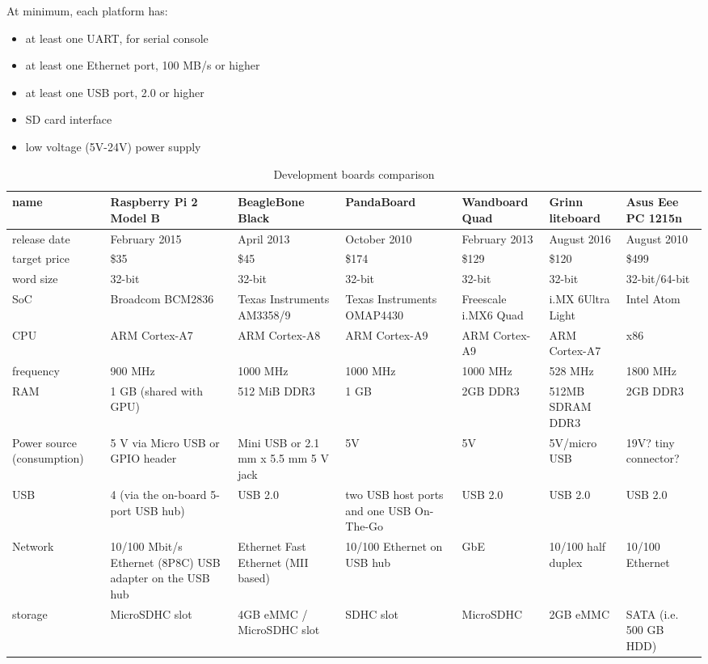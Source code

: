 \documentclass[printmode]{mgr}
\begin{document}
At minimum, each platform has:
\begin{itemize}
  \item at least one UART, for serial console
  \item at least one Ethernet port, 100 MB/s or higher
  \item at least one USB port, 2.0 or higher
  \item SD card interface
  \item low voltage (5V-24V) power supply
\end{itemize}

\renewcommand{\arraystretch}{2}
\begin{table}
  \begin{tabular}{| p{2cm} | p{2cm} | p{2cm} | p{2cm} | p{2cm} | p{2cm} | p{2cm} |}
    \hline
    name & Raspberry Pi 2 Model B & BeagleBone Black & PandaBoard & Wandboard Quad & Grinn liteboard & Asus Eee PC 1215n \\
    \hline
    release date & February 2015 & April 2013 & October 2010 & February 2013 & August 2016 & August 2010\\
    \hline
    target price & \$35 & \$45 & \$174 & \$129 & \$120 & \$499\\
    \hline
    word size & 32-bit & 32-bit & 32-bit & 32-bit & 32-bit & 32-bit/64-bit \\
    \hline
    SoC & Broadcom BCM2836 & Texas Instruments AM3358/9 & Texas Instruments OMAP4430 & Freescale i.MX6 Quad & i.MX 6Ultra Light & Intel Atom\\
    \hline
    CPU & ARM Cortex-A7 & ARM Cortex-A8 & ARM Cortex-A9 & ARM Cortex-A9 & ARM Cortex-A7 & x86\\
    \hline
    frequency & 900 MHz & 1000 MHz & 1000 MHz & 1000 MHz & 528 MHz & 1800 MHz\\
    \hline
    RAM & 1 GB (shared with GPU) & 512 MiB DDR3 & 1 GB & 2GB DDR3 & 512MB SDRAM DDR3  & 2GB DDR3\\
    \hline
    Power source (consumption) & 5 V via Micro USB or GPIO header & Mini USB or 2.1 mm x 5.5 mm 5 V jack & 5V & 5V & 5V/micro USB & 19V? tiny connector?\\
    \hline
    USB & 4 (via the on-board 5-port USB hub) & USB 2.0 & two USB host ports and one USB On-The-Go & USB 2.0 & USB 2.0 & USB 2.0\\
    \hline
    Network & 10/100 Mbit/s Ethernet (8P8C) USB adapter on the USB hub & Ethernet Fast Ethernet (MII based) & 10/100 Ethernet on USB hub & GbE & 10/100 half duplex & 10/100 Ethernet\\
    \hline
    storage & MicroSDHC slot & 4GB eMMC / MicroSDHC slot & SDHC slot & MicroSDHC & 2GB
    eMMC & SATA (i.e. 500 GB HDD)\\
    \hline
  \end{tabular}
  \caption{Development boards comparison}
\end{table}
\end{document}
